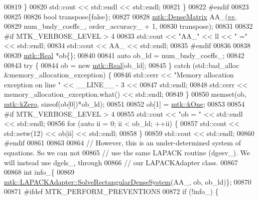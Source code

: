 \begin{DoxyCode}
{{00819       \}
00820       std::cout << std::endl << std::endl;
00821     \}
00822 \textcolor{preprocessor}{    #endif}
00823 
00825 
00826     \textcolor{keywordtype}{bool} transpose\{\textcolor{keyword}{false}\};
00827 
00828     \hyperlink{classmtk_1_1DenseMatrix}{mtk::DenseMatrix} AA\_(gg,
00829                          num\_bndy\_coeffs\_, order\_accuracy\_ + 1,
00830                          transpose);
00831 
00832 \textcolor{preprocessor}{    #if MTK\_VERBOSE\_LEVEL > 4}
00833     std::cout << \textcolor{stringliteral}{"AA\_"} << ll << \textcolor{stringliteral}{" ="} << std::endl;
00834     std::cout << AA\_ << std::endl;
00835 \textcolor{preprocessor}{    #endif}
00836 
00838 
00839     \hyperlink{group__c01-roots_gac080bbbf5cbb5502c9f00405f894857d}{mtk::Real} *ob\{\};
00840 
00841     \textcolor{keyword}{auto} ob\_ld = num\_bndy\_coeffs\_;
00842 
00843     \textcolor{keywordflow}{try} \{
00844       ob = \textcolor{keyword}{new} \hyperlink{group__c01-roots_gac080bbbf5cbb5502c9f00405f894857d}{mtk::Real}[ob\_ld];
00845     \} \textcolor{keywordflow}{catch} (std::bad\_alloc &memory\_allocation\_exception) \{
00846       std::cerr << \textcolor{stringliteral}{"Memory allocation exception on line "} << \_\_LINE\_\_ - 3 <<
00847         std::endl;
00848       std::cerr << memory\_allocation\_exception.what() << std::endl;
00849     \}
00850     memset(ob, \hyperlink{group__c01-roots_ga59a451a5fae30d59649bcda274fea271}{mtk::kZero}, \textcolor{keyword}{sizeof}(ob[0])*ob\_ld);
00851 
00852     ob[1] = \hyperlink{group__c01-roots_ga26407c24d43b6b95480943340d285c71}{mtk::kOne};
00853 
00854 \textcolor{preprocessor}{    #if MTK\_VERBOSE\_LEVEL > 4}
00855     std::cout << \textcolor{stringliteral}{"ob = "} << std::endl << std::endl;
00856     \textcolor{keywordflow}{for} (\textcolor{keyword}{auto} ii = 0; ii < ob\_ld; ++ii) \{
00857       std::cout << std::setw(12) << ob[ii] << std::endl;
00858     \}
00859     std::cout << std::endl;
00860 \textcolor{preprocessor}{    #endif}
00861 
00863 
00864     \textcolor{comment}{// However, this is an under-determined system of equations. So we can not}
00865     \textcolor{comment}{// use the same LAPACK routine (dgesv\_). We will instead use dgels\_, through}
00866     \textcolor{comment}{// our LAPACKAdapter class.}
00867 
00868     \textcolor{keywordtype}{int} info\_\{
00869       \hyperlink{classmtk_1_1LAPACKAdapter_a380f148ffdf96bae2f79ae28f1a6560c}{mtk::LAPACKAdapter::SolveRectangularDenseSystem}(AA\_, 
      ob, ob\_ld)\};
00870 
00871 \textcolor{preprocessor}{    #ifdef MTK\_PERFORM\_PREVENTIONS}
00872     \textcolor{keywordflow}{if} (!info\_) \{
}}
\end{DoxyCode}

